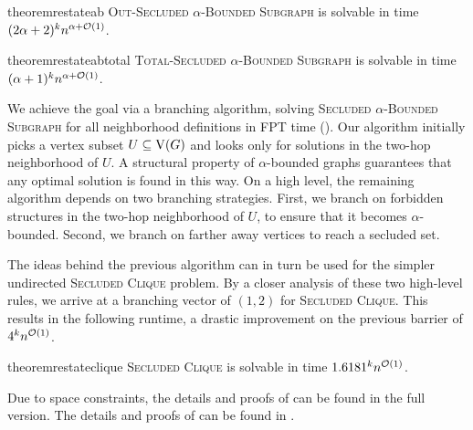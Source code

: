 \begin{restatable}[]{theorem}{restateab}
\label{thm:alpha_bounded_fpt}
  \textsc{Out-Secluded $\alpha$-Bounded Subgraph} is solvable in time $(2\alpha + 2)^kn^{\alpha+\mathcal{O}(1)}$.
\end{restatable} 

\begin{restatable}[]{theorem}{restateabtotal}
\label{thm:alpha_bounded_total}
  \textsc{Total-Secluded $\alpha$-Bounded Subgraph} is solvable in time $(\alpha + 1)^kn^{\alpha+\mathcal{O}(1)}$.
\end{restatable} 

We achieve the goal via a branching algorithm, solving \textsc{Secluded $\alpha$-Bounded Subgraph} for all neighborhood definitions in FPT time ().
Our algorithm initially picks a vertex subset $U \subseteq \operatorname{V}({G})$ and looks only for solutions in the two-hop neighborhood of $U$. A structural property of $\alpha$-bounded graphs guarantees that any optimal solution is found in this way. 
On a high level, the remaining algorithm depends on two branching strategies. First, we branch on forbidden structures in the two-hop neighborhood of $U$, to ensure that it becomes $\alpha$-bounded. Second, we branch on farther away vertices to reach a secluded set. 

The ideas behind the previous algorithm can in turn be used for the simpler undirected \textsc{Secluded Clique} problem.
By a closer analysis of these two high-level rules, we arrive at a branching vector of $(1,2)$ for \textsc{Secluded Clique}. This results in the following runtime, a drastic improvement on the previous barrier of $4^kn^{\mathcal{O}(1)}$.

\begin{restatable}[]{theorem}{restateclique}
\label{thm:clique_better}
  \textsc{Secluded Clique} is solvable in time $1.6181^k n^{\mathcal{O}(1)}$.
\end{restatable}

\ifshort Due to space constraints, the details and proofs of  can be found in the full version.
\else The details and proofs of  can be found in .
\fi


